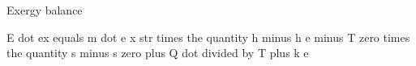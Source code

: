 Exergy balance

E dot ex equals m dot e x str times the quantity h minus h e minus T zero times the quantity s minus s zero plus Q dot divided by T plus k e